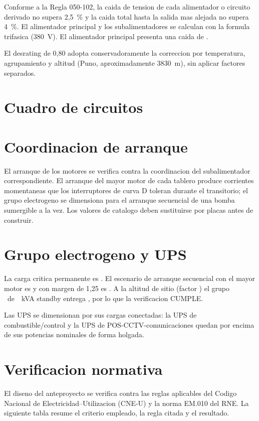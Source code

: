 Conforme a la Regla 050-102, la caida de tension de cada alimentador o
circuito derivado no supera 2,5~\% y la caida total hasta la salida mas
alejada no supera 4~\%. El alimentador principal y los subalimentadores se
calculan con la formula trifasica (380~V). El alimentador principal presenta
una caida de \dVAlim.

El desrating de 0,80 adopta conservadoramente la correccion por temperatura,
agrupamiento y altitud (Puno, aproximadamente 3830~m), sin aplicar factores
separados.

\section{Cuadro de circuitos}
\ALIMENTADORESTAB

\bigskip
\CIRCUITOSTAB

\section{Coordinacion de arranque}
El arranque de los motores se verifica contra la coordinacion del
subalimentador correspondiente. El arranque del mayor motor de cada tablero
produce corrientes momentaneas que los interruptores de curva D toleran
durante el transitorio; el grupo electrogeno se dimensiona para el arranque
secuencial de una bomba sumergible a la vez. Los valores de catalogo deben
sustituirse por placas antes de construir.

\section{Grupo electrogeno y UPS}
La carga critica permanente es \EmergKVA. El escenario de arranque secuencial
con el mayor motor es \ArranqueKVA y con margen de 1,25 es \ArranqueMargen. A
la altitud de sitio (factor \AltFactor) el grupo \GrupoModelo~de~\GrupoNom~kVA
standby entrega \GrupoDisp, por lo que la verificacion CUMPLE.

Las UPS se dimensionan por sus cargas conectadas: la UPS de
combustible/control y la UPS de POS-CCTV-comunicaciones quedan por encima de
sus potencias nominales de forma holgada.

\section{Verificacion normativa}
El diseno del anteproyecto se verifica contra las reglas aplicables del Codigo
Nacional de Electricidad--Utilizacion (CNE-U) y la norma EM.010 del RNE. La
siguiente tabla resume el criterio empleado, la regla citada y el resultado.

